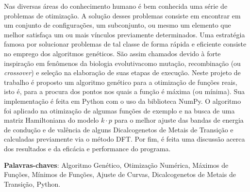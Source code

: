 Nas diversas áreas do conhecimento humano é bem conhecida uma série de problemas de otimização. 
A solução desses problemas consiste em encontrar em um conjunto de configurações, um subconjunto,
ou mesmo um elemento que melhor satisfaça um ou mais vínculos previamente determinados. Uma
estratégia famosa por solucionar problemas de tal classe de forma rápida e eficiente consiste no
emprego dos algoritmos genéticos. São assim chamados devido à forte inspiração em fenômenos
da biologia evolutiva\trav como mutação, recombinação (ou \textit{crossover}) e seleção\trav
na elaboração de suas etapas de execução. Neste projeto de trabalho é proposto um algoritmo genético para
a otimização de funções reais, isto é, para a procura dos pontos nos quais a função é máxima
(ou mínima). Sua implementação é feita em Python com o uso da biblioteca NumPy. 
O algoritmo foi aplicado na otimização de algumas funções de exemplo e na busca
de uma matriz Hamiltoniana do modelo $ k \cdot p $ para o melhor ajuste das bandas de
energia de condução e de valência de alguns Dicalcogenetos de Metais de Transição\trav {} e
\trav calculadas previamente via o método DFT. Por fim, é feita uma discussão
acerca dos resultados e da eficácia e performance do programa. 

\vspace{\onelineskip}\noindent
\textbf{Palavras-chaves}: Algoritmo Genético, Otimização Numérica, Máximos de
Funções, Mínimos de Funções, Ajuste de Curvas, Dicalcogenetos de Metais de
Transição, Python.